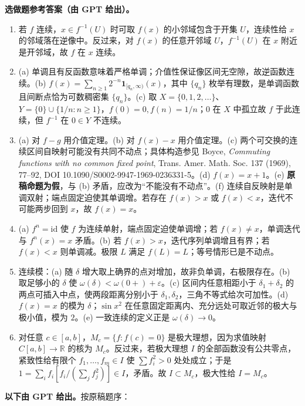 \noindent\textbf{选做题参考答案（由 GPT 给出）。}
\begin{enumerate}
\item 若 $f$ 连续，$x\in f^{-1}(U)$ 时可取 $f(x)$ 的小邻域包含于开集 $U$，连续性给 $x$ 的邻域落在逆像中。反过来，对 $f(x)$ 的任意开邻域 $U$，$f^{-1}(U)$ 在 $x$ 附近是开邻域，故 $f$ 在 $x$ 连续。
\item (a) 单调且有反函数意味着严格单调；介值性保证像区间无空隙，故逆函数连续。(b) $f(x)=\sum_{n\ge1}2^{-n}\mathbf1_{[q_n,\infty)}(x)$，其中 $\{q_n\}$ 枚举有理数，是单调函数且间断点恰为可数稠密集 $\{q_n\}$。(c) 取 $X=\{0,1,2,\ldots\}$、$Y=\{0\}\cup\{1/n:n\ge1\}$，$f(0)=0,f(n)=1/n$；$0$ 在 $X$ 中孤立故 $f$ 于此连续，但 $f^{-1}$ 在 $0\in Y$ 不连续。
\item (a) 对 $f-g$ 用介值定理。(b) 对 $f(x)-x$ 用介值定理。(c) 两个可交换的连续区间自映射可能没有共同不动点；具体构造参见 Boyce, \emph{Commuting functions with no common fixed point}, Trans. Amer. Math. Soc. 137 (1969), 77--92, DOI 10.1090/S0002-9947-1969-0236331-5。(d) $f(x)=x+1$。(e) \textbf{原稿命题为假}，与 (b) 矛盾，应改为“不能没有不动点”。(f) 连续自反映射是单调双射；端点固定迫使其单调增。若存在 $f(x)>x$ 或 $f(x)<x$，迭代不可能两步回到 $x$，故 $f(x)=x$。
\item (a) $f^n=\mathrm{id}$ 使 $f$ 为连续单射，端点固定迫使单调增；若 $f(x)\ne x$，单调迭代与 $f^n(x)=x$ 矛盾。(b) 若 $f(x)>x$，迭代序列单调增且有界；若 $f(x)<x$ 则单调减。极限 $L$ 满足 $f(L)=L$；等号情形已是不动点。
\item 连续模：(a) 随 $\delta$ 增大取上确界的点对增加，故非负单调，右极限存在。(b) 取足够小的 $\delta$ 使 $\omega(\delta)<\omega(0+)+\varepsilon$。(c) 区间内任意相距小于 $\delta_1+\delta_2$ 的两点可插入中点，使两段距离分别小于 $\delta_1,\delta_2$，三角不等式给次可加性。(d) $f(x)=x$ 的模为 $\delta$；$\sin x^2$ 在任意固定距离内、充分远处可取近邻的极大与极小值，模为 $2$。(e) 一致连续的定义正是 $\omega(\delta)\to0$。
\item 对任意 $c\in[a,b]$，$M_c=\{f:f(c)=0\}$ 是极大理想，因为求值映射 $C[a,b]\to\mathbb R$ 的核为 $M_c$。反过来，若极大理想 $I$ 的全部函数没有公共零点，紧致性给有限个 $f_1,\ldots,f_m\in I$ 使 $\sum f_i^2>0$ 处处成立；于是 $1=\sum_i f_i[f_i/(\sum_jf_j^2)]\in I$，矛盾。故 $I\subset M_c$，极大性给 $I=M_c$。
\end{enumerate}
\noindent\textbf{以下由 GPT 给出。}按原稿题序：
